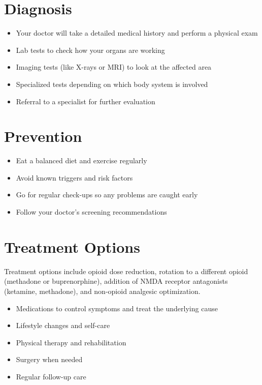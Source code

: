 \section{Diagnosis}

\begin{itemize}[noitemsep]
  \item Your doctor will take a detailed medical history and perform a physical exam
  \item Lab tests to check how your organs are working
  \item Imaging tests (like X-rays or MRI) to look at the affected area
  \item Specialized tests depending on which body system is involved
  \item Referral to a specialist for further evaluation
\end{itemize}

\section{Prevention}

\begin{itemize}[noitemsep]
  \item Eat a balanced diet and exercise regularly
  \item Avoid known triggers and risk factors
  \item Go for regular check-ups so any problems are caught early
  \item Follow your doctor's screening recommendations
\end{itemize}

\section{Treatment Options}
Treatment options include opioid dose reduction, rotation to a different opioid (methadone or buprenorphine), addition of NMDA receptor antagonists (ketamine, methadone), and non-opioid analgesic optimization.

\begin{itemize}[noitemsep]
  \item Medications to control symptoms and treat the underlying cause
  \item Lifestyle changes and self-care
  \item Physical therapy and rehabilitation
  \item Surgery when needed
  \item Regular follow-up care
\end{itemize}

